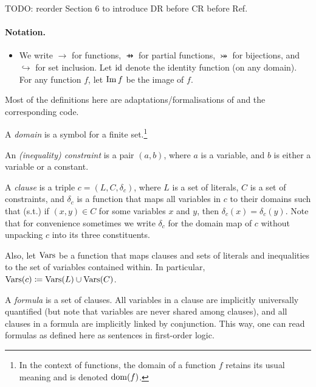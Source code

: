 TODO: reorder Section 6 to introduce DR before CR before Ref.

\paragraph{Notation.}
\begin{itemize}
\item We write $\to$ for functions, $\pfun$ for partial functions, $\twoheadrightarrowtail$ for bijections, and $\hookrightarrow$ for set inclusion. Let $\operatorname{id}$ denote the identity function (on any domain). For any function $f$, let $\operatorname{Im} f$ be the image of $f$.
\end{itemize}

Most of the definitions here are adaptations/formalisations of \citep{DBLP:conf/ijcai/BroeckTMDR11} and the corresponding code.

\begin{definition}
  A \emph{domain} is a symbol for a finite set.\footnote{In the context of functions, the domain of a function $f$ retains its usual meaning and is denoted $\operatorname{dom}(f)$.}
\end{definition}

\begin{definition}
  An \emph{(inequality) constraint} is a pair $(a, b)$, where $a$ is a variable, and $b$ is either a variable or a constant.
\end{definition}

\begin{definition}
  A \emph{clause} is a triple $c = (L, C, \delta_c)$, where $L$ is a set of literals, $C$ is a set of constraints, and $\delta_c$ is a function that maps all variables in $c$ to their domains such that (s.t.) if $(x, y) \in C$ for some variables $x$ and $y$, then $\delta_c(x) = \delta_c(y)$. Note that for convenience sometimes we write $\delta_c$ for the domain map of $c$ without unpacking $c$ into its three constituents.

  Also, let $\operatorname{Vars}$ be a function that maps clauses and sets of literals and inequalities to the set of variables contained within. In particular, $\operatorname{Vars}(c) \coloneqq \operatorname{Vars}(L) \cup \operatorname{Vars}(C)$.
\end{definition}

A \emph{formula} is a set of clauses. All variables in a clause are implicitly universally quantified (but note that variables are never shared among clauses), and all clauses in a formula are implicitly linked by conjunction. This way, one can read formulas as defined here as sentences in first-order logic.

